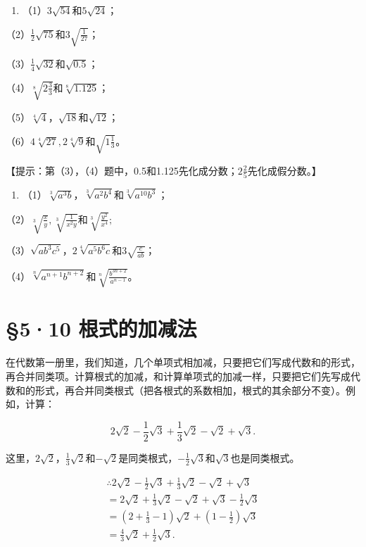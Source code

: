 \begin{enumerate}
\item
  （1）\(3\sqrt{54}\)和\(5\sqrt{24}\)；
\end{enumerate}

（2）\(\frac{1}{2}\sqrt{75}\)和\(3\sqrt{\frac{1}{27}}\)；

（3）\(\frac{1}{4}\sqrt{32}\)和\(\sqrt{0.5}\)；

（4）\(\sqrt[8]{2\frac{3}{3}}\)和\(\sqrt[8]{1.125}\)；

（5）\(\sqrt[4]{4}\)，\(\sqrt{18}\)和\(\sqrt{12}\)；

（6）\(4\sqrt[4]{27}, 2\sqrt[4]{9}\)和\(\sqrt{1\frac{1}{3}}\)。

【提示：第（3），（4）题中，0.5和1.125先化成分数；\(2\frac{2}{5}\)先化成假分数。】

\begin{enumerate}[start=2]
\item
  （1）\(\sqrt[3]{a^{3}b}\)，\(\sqrt[3]{a^2b^4}\)和\(\sqrt[3]{a^{10}b^3}\)；
\end{enumerate}

（2）\(\sqrt[3]{\frac{x}{y}}, \sqrt[3]{\frac{1}{x^2y}}\)和\(\sqrt[3]{\frac{y^2}{x^4}};\)

（3）\(\sqrt{ab^3c^5}\)，\(2\sqrt[4]{a^5b^6c}\)和\(3\sqrt{\frac{c}{ab}}\)；

（4）\(\sqrt[n]{a^{n+1}b^{n+2}}\)和\(\sqrt[n]{\frac{b^{3n+2}}{a^{n-1}}}\)。

\section{§5·10 根式的加减法}

在代数第一册里，我们知道，几个单项式相加减，只要把它们写成代数和的形式，再合并同类项。计算根式的加减，和计算单项式的加减一样，只要把它们先写成代数和的形式，再合并同类根式（把各根式的系数相加，根式的其余部分不变）。例如，计算：

\[
2 \sqrt {2} - \frac{1}{2} \sqrt {3} + \frac{1}{3} \sqrt {2} - \sqrt {2} + \sqrt {3}.
\]

这里，\(2\sqrt{2}\)，\(\frac{1}{3}\sqrt{2}\)和\(-\sqrt{2}\)是同类根式，\(-\frac{1}{2}\sqrt{3}\)和\(\sqrt{3}\)也是同类根式。

\[
\begin{array}{l} \therefore 2 \sqrt {2} - \frac{1}{2} \sqrt {3} + \frac{1}{3} \sqrt {2} - \sqrt {2} + \sqrt {3} \\ = 2 \sqrt {2} + \frac{1}{3} \sqrt {2} - \sqrt {2} + \sqrt {3} - \frac{1}{2} \sqrt {3} \\ = (2 + \frac{1}{3} - 1) \sqrt {2} + (1 - \frac{1}{2}) \sqrt {3} \\ = \frac{4}{3} \sqrt {2} + \frac{1}{2} \sqrt {3}. \\ \end{array}
\]

